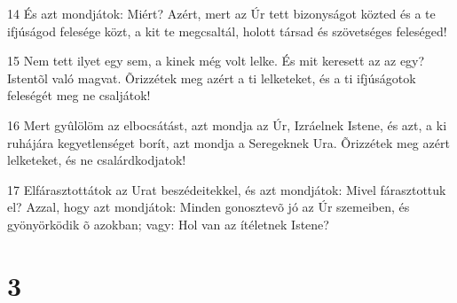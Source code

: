 \par 14 És azt mondjátok: Miért? Azért, mert az Úr tett bizonyságot közted és a te ifjúságod felesége közt, a kit te megcsaltál, holott társad és szövetséges feleséged!
\par 15 Nem tett ilyet egy sem, a kinek még volt lelke. És mit keresett az az egy? Istentõl való magvat. Õrizzétek meg azért a ti lelketeket, és a ti ifjúságotok feleségét meg ne csaljátok!
\par 16 Mert gyûlölöm az elbocsátást, azt mondja az Úr, Izráelnek Istene, és azt, a ki ruhájára kegyetlenséget borít, azt mondja a Seregeknek Ura. Õrizzétek meg azért lelketeket, és ne csalárdkodjatok!
\par 17 Elfárasztottátok az Urat beszédeitekkel, és azt mondjátok: Mivel fárasztottuk el? Azzal, hogy azt mondjátok: Minden gonosztevõ jó az Úr szemeiben, és gyönyörködik õ azokban; vagy: Hol van az ítéletnek Istene?

\chapter{3}

